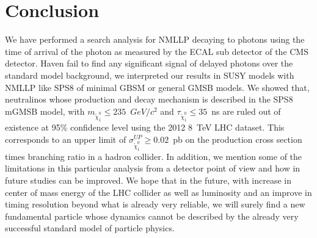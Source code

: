 \chapter{Conclusion}
\label{conclusion_chapter}
We have performed a search analysis for NMLLP decaying to photons using the time of arrival of the photon as measured by the ECAL sub detector of the CMS detector.
Haven fail to find any significant signal of delayed photons over the standard model background, we interpreted our results in SUSY models with NMLLP like SPS8 of minimal GBSM or general GMSB models.
We showed that, neutralinos whose production and decay mechanism is described in the SPS8 mGMSB model,  with $m_{\tilde{\chi}^{0}_{1}} \leq 235$~$GeV/c^{2}$ and $\tau_{\tilde{\chi}^{0}_{1}} \leq 35$~ns are ruled out of existence at 95\% confidence level using the 2012 $8$~TeV LHC dataset. This corresponds to an upper limit of  $\sigma^{UP}_{\tilde{\chi}^{0}_{1}} \geq 0.02$~pb  on the production cross section times branching ratio in a hadron collider. 
In addition, we mention some of the limitations in this particular analysis from a detector point of view and how in future studies can be improved.
We hope that in the future, with increase in center of mass energy of the LHC collider as well as luminosity and an improve in timing resolution beyond what is already very reliable, we will surely find a new fundamental particle whose dynamics cannot be described by the already very successful standard model of particle physics.


